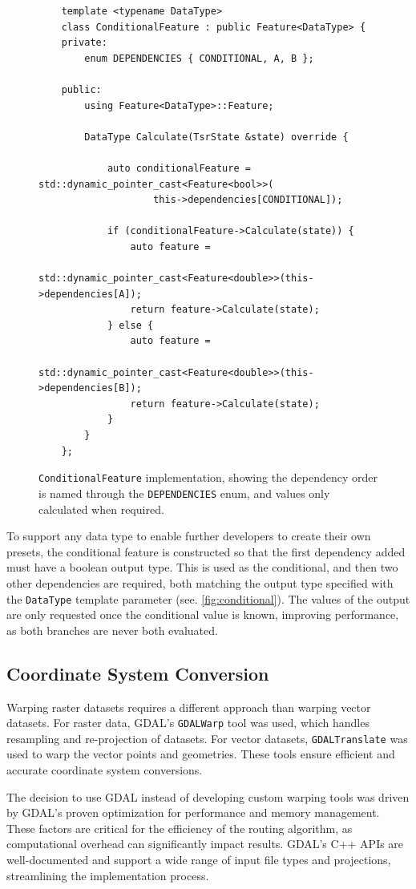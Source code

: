 \documentclass[12pt]{article}
\begin{document}
\begin{figure}[H]
  \centering
  \begin{lstlisting}
	template <typename DataType>
	class ConditionalFeature : public Feature<DataType> {
	private:
		enum DEPENDENCIES { CONDITIONAL, A, B };

	public:
		using Feature<DataType>::Feature;

		DataType Calculate(TsrState &state) override {

			auto conditionalFeature = std::dynamic_pointer_cast<Feature<bool>>(
					this->dependencies[CONDITIONAL]);

			if (conditionalFeature->Calculate(state)) {
				auto feature =
						std::dynamic_pointer_cast<Feature<double>>(this->dependencies[A]);
				return feature->Calculate(state);
			} else {
				auto feature =
						std::dynamic_pointer_cast<Feature<double>>(this->dependencies[B]);
				return feature->Calculate(state);
			}
		}
	};
	\end{lstlisting}
  \caption{\texttt{ConditionalFeature} implementation, showing the dependency order is named through the \texttt{DEPENDENCIES} enum, and values only calculated when required.}
  \label{fig:conditional}
\end{figure}

To support any data type to enable further developers to create their own presets, the conditional feature is constructed so that the first dependency added must have a boolean output type. This is used as the conditional, and then two other dependencies are required, both matching the output type specified with the \texttt{DataType} template parameter (see. \autoref{fig:conditional}). The values of the output are only requested once the conditional value is known, improving performance, as both branches are never both evaluated.

\subsection{Coordinate System Conversion}

Warping raster datasets requires a different approach than warping vector datasets. For raster data, GDAL's \texttt{GDALWarp} tool was used, which handles resampling and re-projection of datasets. For vector datasets, \texttt{GDALTranslate} was used to warp the vector points and geometries. These tools ensure efficient and accurate coordinate system conversions.

The decision to use GDAL instead of developing custom warping tools was driven by GDAL's proven optimization for performance and memory management. These factors are critical for the efficiency of the routing algorithm, as computational overhead can significantly impact results. GDAL's C++ APIs are well-documented and support a wide range of input file types and projections, streamlining the implementation process.
\end{document}
